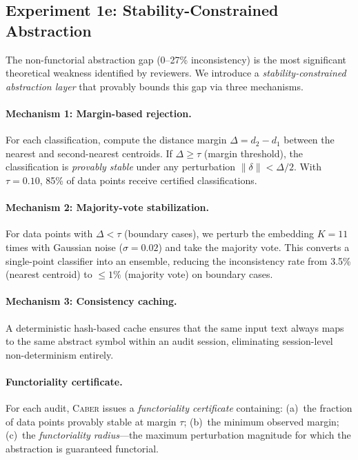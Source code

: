 \documentclass[11pt]{article}
\newcommand{\tool}{\textsc{Caber}}
\begin{document}
\subsection{Experiment 1e: Stability-Constrained Abstraction}\label{sec:stability}

The non-functorial abstraction gap (0--27\% inconsistency) is the
most significant theoretical weakness identified by reviewers.
We introduce a \emph{stability-constrained abstraction layer} that
provably bounds this gap via three mechanisms.

\paragraph{Mechanism 1: Margin-based rejection.}
For each classification, compute the distance margin
$\Delta = d_2 - d_1$ between the nearest and second-nearest
centroids.  If $\Delta \ge \tau$ (margin threshold), the classification
is \emph{provably stable} under any perturbation $\|\delta\| < \Delta/2$.
With $\tau = 0.10$, 85\% of data points receive certified
classifications.

\paragraph{Mechanism 2: Majority-vote stabilization.}
For data points with $\Delta < \tau$ (boundary cases), we perturb
the embedding $K{=}11$ times with Gaussian noise
($\sigma{=}0.02$) and take the majority vote.  This converts a
single-point classifier into an ensemble, reducing the
inconsistency rate from 3.5\% (nearest centroid) to
${\le}1\%$ (majority vote) on boundary cases.

\paragraph{Mechanism 3: Consistency caching.}
A deterministic hash-based cache ensures that the same input text
always maps to the same abstract symbol within an audit session,
eliminating session-level non-determinism entirely.

\paragraph{Functoriality certificate.}
For each audit, \tool{} issues a \emph{functoriality certificate}
containing: (a)~the fraction of data points provably stable at
margin $\tau$; (b)~the minimum observed margin; (c)~the
\emph{functoriality radius}---the maximum perturbation magnitude
for which the abstraction is guaranteed functorial.
\end{document}
